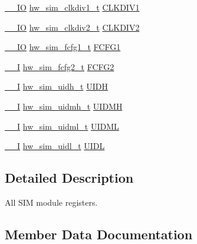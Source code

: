 \begin{DoxyCompactItemize}
\item 
\hyperlink{core__sc300_8h_aec43007d9998a0a0e01faede4133d6be}{\+\_\+\+\_\+\+IO} \hyperlink{union__hw__sim__clkdiv1}{hw\+\_\+sim\+\_\+clkdiv1\+\_\+t} \hyperlink{struct__hw__sim_a8cfdba863c98effcd389e8c3a3ba27f0}{C\+L\+K\+D\+I\+V1}
\item 
\hyperlink{core__sc300_8h_aec43007d9998a0a0e01faede4133d6be}{\+\_\+\+\_\+\+IO} \hyperlink{union__hw__sim__clkdiv2}{hw\+\_\+sim\+\_\+clkdiv2\+\_\+t} \hyperlink{struct__hw__sim_a2d48b9d1699a4bf9b24693778374019e}{C\+L\+K\+D\+I\+V2}
\item 
\hyperlink{core__sc300_8h_aec43007d9998a0a0e01faede4133d6be}{\+\_\+\+\_\+\+IO} \hyperlink{union__hw__sim__fcfg1}{hw\+\_\+sim\+\_\+fcfg1\+\_\+t} \hyperlink{struct__hw__sim_a5c9e113ebd848ccfd7f2dd046d36b565}{F\+C\+F\+G1}
\item 
\hyperlink{core__sc300_8h_af63697ed9952cc71e1225efe205f6cd3}{\+\_\+\+\_\+I} \hyperlink{union__hw__sim__fcfg2}{hw\+\_\+sim\+\_\+fcfg2\+\_\+t} \hyperlink{struct__hw__sim_a8d054b9ce92cf98464c6357d8f30f254}{F\+C\+F\+G2}
\item 
\hyperlink{core__sc300_8h_af63697ed9952cc71e1225efe205f6cd3}{\+\_\+\+\_\+I} \hyperlink{union__hw__sim__uidh}{hw\+\_\+sim\+\_\+uidh\+\_\+t} \hyperlink{struct__hw__sim_ad95bf21ae4a65c8627c87845b51a51e0}{U\+I\+DH}
\item 
\hyperlink{core__sc300_8h_af63697ed9952cc71e1225efe205f6cd3}{\+\_\+\+\_\+I} \hyperlink{union__hw__sim__uidmh}{hw\+\_\+sim\+\_\+uidmh\+\_\+t} \hyperlink{struct__hw__sim_a5b21b77f424bb0e6222f6014bd4df8de}{U\+I\+D\+MH}
\item 
\hyperlink{core__sc300_8h_af63697ed9952cc71e1225efe205f6cd3}{\+\_\+\+\_\+I} \hyperlink{union__hw__sim__uidml}{hw\+\_\+sim\+\_\+uidml\+\_\+t} \hyperlink{struct__hw__sim_a7395a45d8a00dd1a8c04ab5eec4623f4}{U\+I\+D\+ML}
\item 
\hyperlink{core__sc300_8h_af63697ed9952cc71e1225efe205f6cd3}{\+\_\+\+\_\+I} \hyperlink{union__hw__sim__uidl}{hw\+\_\+sim\+\_\+uidl\+\_\+t} \hyperlink{struct__hw__sim_ac4edde90d1af8644f1f4b7cc4a3486ba}{U\+I\+DL}
\end{DoxyCompactItemize}


\subsection{Detailed Description}
All S\+IM module registers. 

\subsection{Member Data Documentation}
